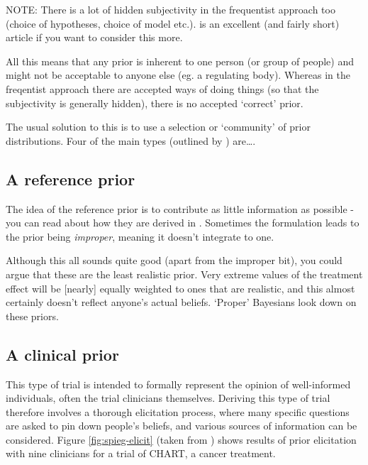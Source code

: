 \documentclass[
  openany]{book}
\theoremstyle{definition}
\theoremstyle{definition}
\theoremstyle{definition}
\theoremstyle{definition}
\theoremstyle{remark}
\begin{document}
NOTE: There is a lot of hidden subjectivity in the frequentist approach too (choice of hypotheses, choice of model etc.). \citet{berger1988statistical} is an excellent (and fairly short) article if you want to consider this more.

All this means that any prior is inherent to one person (or group of people) and might not be acceptable to anyone else (eg. a regulating body). Whereas in the freqentist approach there are accepted ways of doing things (so that the subjectivity is generally hidden), there is no accepted `correct' prior.

The usual solution to this is to use a selection or `community' of prior distributions. Four of the main types (outlined by \citet{spiegelhalter1994bayesian}) are\ldots.

\subsection*{A reference prior}\label{a-reference-prior}

The idea of the reference prior is to contribute as little information as possible - you can read about how they are derived in \citet{berger2009formal}. Sometimes the formulation leads to the prior being \emph{improper}, meaning it doesn't integrate to one.

Although this all sounds quite good (apart from the improper bit), you could argue that these are the least realistic prior. Very extreme values of the treatment effect will be {[}nearly{]} equally weighted to ones that are realistic, and this almost certainly doesn't reflect anyone's actual beliefs. `Proper' Bayesians look down on these priors.

\subsection*{A clinical prior}\label{a-clinical-prior}

This type of trial is intended to formally represent the opinion of well-informed individuals, often the trial clinicians themselves. Deriving this type of trial therefore involves a thorough elicitation process, where many specific questions are asked to pin down people's beliefs, and various sources of information can be considered. Figure \ref{fig:spieg-elicit} (taken from \citet{spiegelhalter1994bayesian}) shows results of prior elicitation with nine clinicians for a trial of CHART, a cancer treatment.
\end{document}
